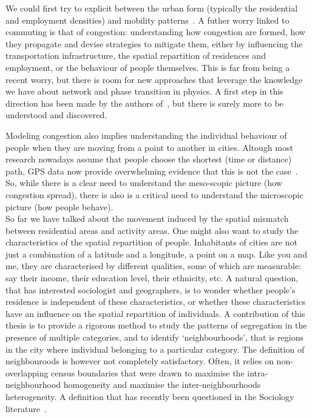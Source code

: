 We could first try to explicit between the urban form (typically the residential
and employment densities) and mobility patterns~\cite{Ma:2006,Chowdhury:2013}.
A futher worry linked to commuting is that of
congestion: understanding how congestion are formed, how they propagate and
devise strategies to mitigate them, either by influencing the transportation
infrastructure, the spatial repartition of residences and employment, or the
behaviour of people themselves.  This is far from being a recent worry, but there is room for new approaches that leverage the knowledge we have about
network and phase transition in physics. A first step in this direction has been
made by the authors of~\cite{Daqing:2015}, but there is surely more to be
understood and discovered.  

Modeling congestion also implies understanding the individual behaviour of
people when they are moving from a point to another in cities. Altough most
research nowadays assume that people choose the shortest (time or distance)
path, GPS data now provide overwhelming evidence that this is not the
case~\cite{Manley:2015}. So, while there is a clear need to understand the meso-scopic
picture (how congestion spread), there is also is a critical need to understand
the microscopic picture (how people behave).\\

So far we have talked about the movement induced by the spatial mismatch between
residential areas and activity areas. One might also want to study the
characteristics of the spatial repartition of people. Inhabitants of cities are
not just a combination of a latitude and a longitude, a point on a map. Like you
and me, they are characterised by different qualities, some of which are
measurable: say their income, their education level, their ethnicity, etc. A
natural question, that has interested sociologist and geographers, is to wonder
whether people's residence is independent of these characteristics, or whether
these characteristics have an influence on the spatial repartition of
individuals.  A contribution of this thesis is to provide a rigorous method to
study the patterns of segregation in the presence of multiple categories, and to
identify `neighbourhoods', that is regions in the city where individual
belonging to a particular category. The definition of neighbouroods is however
not completely satisfactory. Often, it relies on non-overlapping census
boundaries that were drawn to maximise the intra-neighbourhood homogeneity and
maximise the inter-neighbourhoods heterogeneity. A definition that has recently
been questioned in the Sociology literature~\cite{Hipp:2012}.\\




